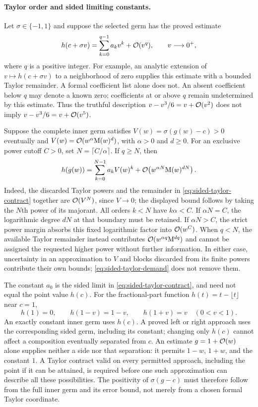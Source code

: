 \paragraph{Taylor order and sided limiting constants.}
Let $\sigma\in\{-1,1\}$ and suppose the selected germ has the proved estimate
\begin{equation}
 h(c+\sigma v)=\sum_{k=0}^{q-1}a_kv^k+\mathcal O(v^q),
 \qquad v\longrightarrow0^+,
 \label{eq:sided-taylor-contract}
\end{equation}
where $q$ is a positive integer. For example, an analytic extension of
$v\mapsto h(c+\sigma v)$ to a neighborhood of zero supplies this estimate
with a bounded Taylor remainder. A formal coefficient list alone does not.
An absent coefficient below $q$ may denote a known zero; coefficients at
or above $q$ remain undetermined by this estimate. Thus the truthful
description $v-v^3/6=v+\mathcal O(v^2)$ does not imply
$v-v^3/6=v+\mathcal O(v^5)$.

Suppose the complete inner germ satisfies
$V(w)=\sigma(g(w)-c)>0$ eventually and
$V(w)=\mathcal O(w^\alpha\mathrm M(w)^d)$, with $\alpha>0$ and $d\ge0$.
For an exclusive power cutoff $C>0$, set $N=\lceil C/\alpha\rceil$.
If $q\ge N$, then
\begin{equation}
 h(g(w))=\sum_{k=0}^{N-1}a_kV(w)^k
   +\mathcal O\!\left(w^{\alpha N}\mathrm M(w)^{dN}\right).
 \label{eq:sided-taylor-demand}
\end{equation}
Indeed, the discarded Taylor powers and the remainder in
\eqref{eq:sided-taylor-contract} together are $\mathcal O(V^N)$, since $V\to0$;
the displayed bound follows by taking the $N$th power of its majorant.
All orders $k<N$ have $k\alpha<C$. If $\alpha N=C$, the logarithmic degree
$dN$ at that boundary must be retained. If $\alpha N>C$, the strict power
margin absorbs this fixed logarithmic factor into $\mathcal O(w^C)$.
When $q<N$, the available Taylor remainder instead contributes
$\mathcal O(w^{\alpha q}\mathrm M^{dq})$ and cannot be assigned the requested higher
power without further information. In either case, uncertainty in an
approximation to $V$ and blocks discarded from its finite powers contribute
their own bounds; \eqref{eq:sided-taylor-demand} does not remove them.

The constant $a_0$ is the sided limit in
\eqref{eq:sided-taylor-contract}, and need not equal the point value $h(c)$.
For the fractional-part function $h(t)=t-\lfloor t\rfloor$ near $c=1$,
\[
 h(1)=0,\qquad h(1-v)=1-v,\qquad h(1+v)=v
 \quad(0<v<1).
\]
An exactly constant inner germ uses $h(c)$. A proved left or right approach
uses the corresponding sided germ, including its constant; changing only
$h(c)$ cannot affect a composition eventually separated from $c$.
An estimate $g=1+\mathcal O(w)$ alone supplies neither a side nor that separation:
it permits $1-w$, $1+w$, and the constant $1$. A Taylor contract valid on
every permitted approach, including the point if it can be attained, is
required before one such approximation can describe all these possibilities.
The positivity of $\sigma(g-c)$ must therefore follow from the full inner
germ and its error bound, not merely from a chosen formal Taylor coordinate.

